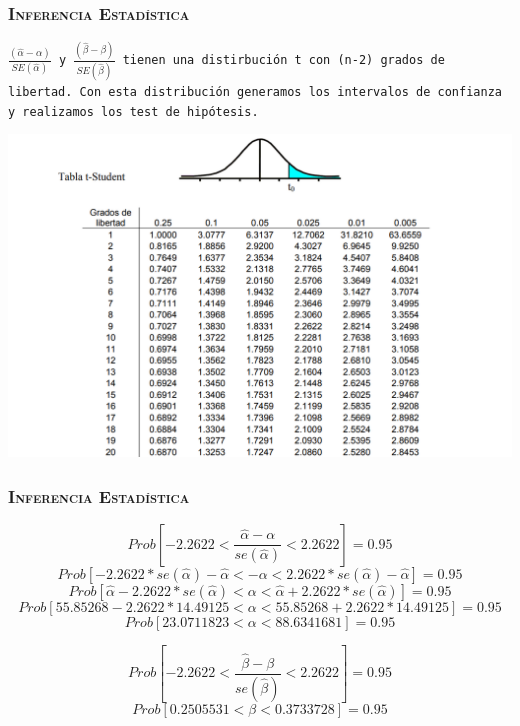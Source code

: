 \documentclass[16.5pt]{beamer}
\begin{document}
{
\begin{frame}
\frametitle{\textsc{Inferencia Estadística}}
\hspace*{-5mm}
\vspace*{-5mm} 

\texttt{$\frac{(\hat\alpha-\alpha)}{SE(\hat\alpha)}$ y $\frac{(\hat\beta-\beta)}{SE(\hat\beta)}$ tienen una distirbución t con (n-2) grados de libertad. Con esta distribución generamos los intervalos de confianza y realizamos los test de hipótesis.}
\begin{center}
\includegraphics[scale=0.4]{T-Student.png}
\end{center}

\end{frame}
}

{
\begin{frame}
\frametitle{\textsc{Inferencia Estadística}}
\hspace*{-5mm}
\vspace*{-5mm} 

$$Prob [-2.2622<\frac{\hat\alpha-\alpha}{se(\hat\alpha)}<2.2622]=0.95$$
$$Prob [-2.2622*se(\hat\alpha)-\hat\alpha<-\alpha<2.2622*se(\hat\alpha)-\hat\alpha]=0.95$$
$$Prob [\hat\alpha-2.2622*se(\hat\alpha)<\alpha<\hat\alpha+2.2622*se(\hat\alpha)]=0.95$$
$$Prob [55.85268-2.2622*14.49125<\alpha<55.85268+2.2622*14.49125]=0.95$$
$$Prob [23.0711823<\alpha< 88.6341681]=0.95$$

$$Prob [-2.2622<\frac{\hat\beta-\beta}{se(\hat\beta)}<2.2622]=0.95$$
$$Prob [0.2505531<\beta<  0.3733728]=0.95$$



\end{frame}
}
\end{document}
